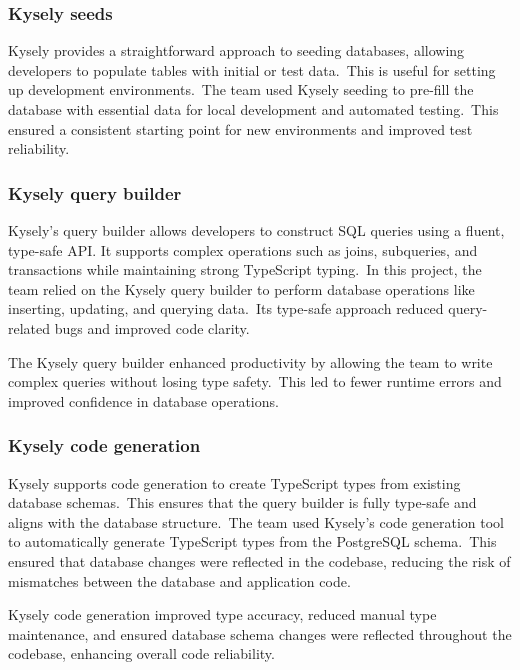 \subsubsection{Kysely seeds}\label{subsubsec:kysely-seeds}

Kysely provides a straightforward approach to seeding databases, allowing developers to populate tables with initial or test data.\ This is useful for setting up development environments.\ The team used Kysely seeding to pre-fill the database with essential data for local development and automated testing.\ This ensured a consistent starting point for new environments and improved test reliability.

\subsubsection{Kysely query builder}\label{subsubsec:kysely-query-builder}

Kysely's query builder allows developers to construct SQL queries using a fluent, type-safe API. It supports complex operations such as joins, subqueries, and transactions while maintaining strong TypeScript typing.\ In this project, the team relied on the Kysely query builder to perform database operations like inserting, updating, and querying data.\ Its type-safe approach reduced query-related bugs and improved code clarity.

The Kysely query builder enhanced productivity by allowing the team to write complex queries without losing type safety.\ This led to fewer runtime errors and improved confidence in database operations.

\subsubsection{Kysely code generation}\label{subsubsec:kysely-code-generation}

Kysely supports code generation to create TypeScript types from existing database schemas.\ This ensures that the query builder is fully type-safe and aligns with the database structure.\ The team used Kysely's code generation tool to automatically generate TypeScript types from the PostgreSQL schema.\ This ensured that database changes were reflected in the codebase, reducing the risk of mismatches between the database and application code.

Kysely code generation improved type accuracy, reduced manual type maintenance, and ensured database schema changes were reflected throughout the codebase, enhancing overall code reliability.

